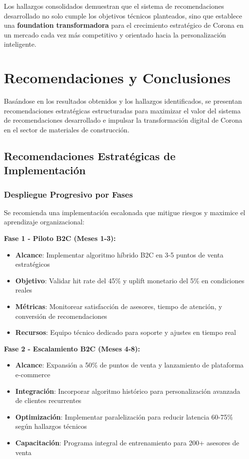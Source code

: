 \documentclass[twocolumn]{article}
\begin{document}
Los hallazgos consolidados demuestran que el sistema de recomendaciones desarrollado no solo cumple los objetivos técnicos planteados, sino que establece una \textbf{foundation transformadora} para el crecimiento estratégico de Corona en un mercado cada vez más competitivo y orientado hacia la personalización inteligente.

\section{Recomendaciones y Conclusiones}

Basándose en los resultados obtenidos y los hallazgos identificados, se presentan recomendaciones estratégicas estructuradas para maximizar el valor del sistema de recomendaciones desarrollado e impulsar la transformación digital de Corona en el sector de materiales de construcción.

\subsection{Recomendaciones Estratégicas de Implementación}

\subsubsection{Despliegue Progresivo por Fases}

Se recomienda una implementación escalonada que mitigue riesgos y maximice el aprendizaje organizacional:

\textbf{Fase 1 - Piloto B2C (Meses 1-3):}
\begin{itemize}
    \item \textbf{Alcance}: Implementar algoritmo híbrido B2C en 3-5 puntos de venta estratégicos
    \item \textbf{Objetivo}: Validar hit rate del 45\% y uplift monetario del 5\% en condiciones reales
    \item \textbf{Métricas}: Monitorear satisfacción de asesores, tiempo de atención, y conversión de recomendaciones
    \item \textbf{Recursos}: Equipo técnico dedicado para soporte y ajustes en tiempo real
\end{itemize}

\textbf{Fase 2 - Escalamiento B2C (Meses 4-8):}
\begin{itemize}
    \item \textbf{Alcance}: Expansión a 50\% de puntos de venta y lanzamiento de plataforma e-commerce
    \item \textbf{Integración}: Incorporar algoritmo histórico para personalización avanzada de clientes recurrentes
    \item \textbf{Optimización}: Implementar paralelización para reducir latencia 60-75\% según hallazgos técnicos
    \item \textbf{Capacitación}: Programa integral de entrenamiento para 200+ asesores de venta
\end{itemize}
\end{document}
